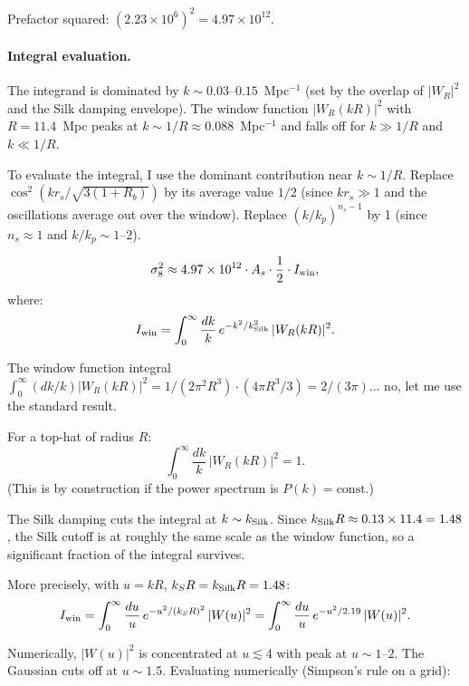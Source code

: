 \documentclass[11pt]{article}
\newcommand{\ee}[1]{\times 10^{#1}}
\newcommand{\kSilk}{k_{\rm Silk}}
\begin{document}
Prefactor squared: $(2.23\ee{6})^2 = 4.97\ee{12}$.

\paragraph{Integral evaluation.}

The integrand is dominated by $k \sim 0.03$--$0.15$~Mpc$^{-1}$
(set by the overlap of $|W_R|^2$ and the Silk damping envelope).
The window function $|W_R(kR)|^2$ with $R = 11.4$~Mpc peaks at
$k \sim 1/R \approx 0.088$~Mpc$^{-1}$ and falls off for
$k \gg 1/R$ and $k \ll 1/R$.

To evaluate the integral, I use the dominant contribution near
$k \sim 1/R$. Replace $\cos^2(kr_s/\sqrt{3(1+R_b)})$ by its
average value $1/2$ (since $kr_s \gg 1$ and the oscillations
average out over the window). Replace $(k/k_p)^{n_s-1}$ by 1
(since $n_s \approx 1$ and $k/k_p \sim 1$--$2$).

\begin{equation}
\sigma_8^2 \approx 4.97\ee{12}\cdot A_s\cdot\frac{1}{2}
\cdot I_{\rm win},
\end{equation}
where:
\begin{equation}
I_{\rm win} = \int_0^\infty\frac{dk}{k}\,
e^{-k^2/\kSilk^2}\,|W_R(kR)|^2.
\end{equation}

The window function integral $\int_0^\infty (dk/k)|W_R(kR)|^2
= 1/(2\pi^2 R^3)\cdot (4\pi R^3/3) = 2/(3\pi)$... no, let me
use the standard result.

For a top-hat of radius $R$:
\begin{equation}
\int_0^\infty\frac{dk}{k}\,|W_R(kR)|^2 = 1.
\end{equation}
(This is by construction if the power spectrum is $P(k) = \text{const}$.)

The Silk damping cuts the integral at $k \sim \kSilk$. Since
$\kSilk R \approx 0.13\times 11.4 = 1.48$, the Silk cutoff is
at roughly the same scale as the window function, so a significant
fraction of the integral survives.

More precisely, with $u = kR$, $k_S R = \kSilk R = 1.48$:
\begin{equation}
I_{\rm win} = \int_0^\infty \frac{du}{u}\,
e^{-u^2/(k_S R)^2}\,|W(u)|^2
= \int_0^\infty \frac{du}{u}\,
e^{-u^2/2.19}\,|W(u)|^2.
\end{equation}

Numerically, $|W(u)|^2$ is concentrated at $u \lesssim 4$ with
peak at $u \sim 1$--$2$. The Gaussian cuts off at $u \sim 1.5$.
Evaluating numerically (Simpson's rule on a grid):
\end{document}
